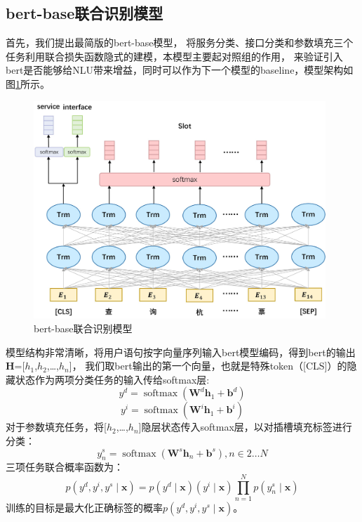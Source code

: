 \subsection{bert-base联合识别模型}
首先，我们提出最简版的bert-base模型，
将服务分类、接口分类和参数填充三个任务利用联合损失函数隐式的建模，本模型主要起对照组的作用，
来验证引入bert是否能够给NLU带来增益，同时可以作为下一个模型的baseline，模型架构如图\ref{fig:bert-base}所示。

\begin{figure}[htbp]
  \centering
  \includegraphics[width=11cm]{./images/bert-base.jpg}
  \caption{bert-base联合识别模型}
  \label{fig:bert-base}
\end{figure}

模型结构非常清晰，将用户语句按字向量序列输入bert模型编码，得到bert的输出$\mathbf{H}$=[$h_{1}$,$h_{2}$,\dots,$h_{n}$]，
我们取bert输出的第一个向量，也就是特殊token（[CLS]）的隐藏状态作为两项分类任务的输入传给softmax层:
\begin{equation}
  y^{d}=\operatorname{softmax}\left(\mathbf{W}^{d} \boldsymbol{h}_{1}+\boldsymbol{b}^{d}\right)
\end{equation}
\begin{equation}
  y^{i}=\operatorname{softmax}\left(\mathbf{W}^{i} \boldsymbol{h}_{1}+\boldsymbol{b}^{i}\right)
\end{equation}
对于参数填充任务，将[$h_{2}$,\dots,$h_{n}$]隐层状态传入softmax层，以对插槽填充标签进行分类：
\begin{equation}
y_{n}^{s}=\operatorname{softmax}\left(\mathbf{W}^{s} \boldsymbol{h}_{n}+\boldsymbol{b}^{s}\right), n \in 2 \ldots N
\end{equation}
三项任务联合概率函数为：
\begin{equation}
  p\left(y^{d},y^{i}, y^{s} \mid \boldsymbol{x}\right)=p\left(y^{d} \mid \boldsymbol{x}\right) \left(y^{i} \mid \boldsymbol{x}\right) \prod_{n=1}^{N} p\left(y_{n}^{s} \mid \boldsymbol{x}\right)
  \end{equation}
  训练的目标是最大化正确标签的概率$p\left(y^{d},y^{i}, y^{s} \mid \boldsymbol{x}\right)$。

